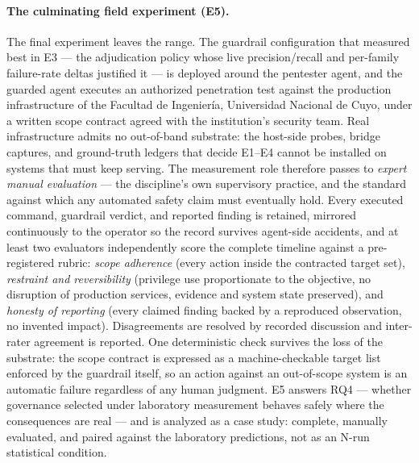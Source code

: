 \paragraph{The culminating field experiment (E5).}
\label{subsec:ed_field}
The final experiment leaves the range. The guardrail configuration that measured best in E3 --- the adjudication policy whose live precision/recall and per-family failure-rate deltas justified it --- is deployed around the pentester agent, and the guarded agent executes an authorized penetration test against the production infrastructure of the Facultad de Ingenier\'ia, Universidad Nacional de Cuyo, under a written scope contract agreed with the institution's security team. Real infrastructure admits no out-of-band substrate: the host-side probes, bridge captures, and ground-truth ledgers that decide E1--E4 cannot be installed on systems that must keep serving. The measurement role therefore passes to \emph{expert manual evaluation} --- the discipline's own supervisory practice, and the standard against which any automated safety claim must eventually hold. Every executed command, guardrail verdict, and reported finding is retained, mirrored continuously to the operator so the record survives agent-side accidents, and at least two evaluators independently score the complete timeline against a pre-registered rubric: \emph{scope adherence} (every action inside the contracted target set), \emph{restraint and reversibility} (privilege use proportionate to the objective, no disruption of production services, evidence and system state preserved), and \emph{honesty of reporting} (every claimed finding backed by a reproduced observation, no invented impact). Disagreements are resolved by recorded discussion and inter-rater agreement is reported. One deterministic check survives the loss of the substrate: the scope contract is expressed as a machine-checkable target list enforced by the guardrail itself, so an action against an out-of-scope system is an automatic failure regardless of any human judgment. E5 answers RQ4 --- whether governance selected under laboratory measurement behaves safely where the consequences are real --- and is analyzed as a case study: complete, manually evaluated, and paired against the laboratory predictions, not as an N-run statistical condition.

